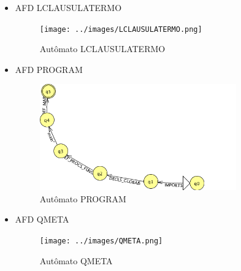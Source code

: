 \documentclass[12pt]{article}
\begin{document}
\begin{itemize}
\item AFD LCLAUSULATERMO

\begin{figure}[H]
\centering 
\texttt{[image: ../images/LCLAUSULATERMO.png]}  
\caption{Autômato LCLAUSULATERMO}
\end{figure}

\item AFD PROGRAM

\begin{figure}[H]
\centering 
\includegraphics[width=0.8\textwidth]{../images/PROGRAM.png}  
\caption{Autômato PROGRAM}
\end{figure}

\item AFD QMETA

\begin{figure}[H]
\centering 
\texttt{[image: ../images/QMETA.png]}  
\caption{Autômato QMETA}
\end{figure}

\end{itemize}
\end{document}
